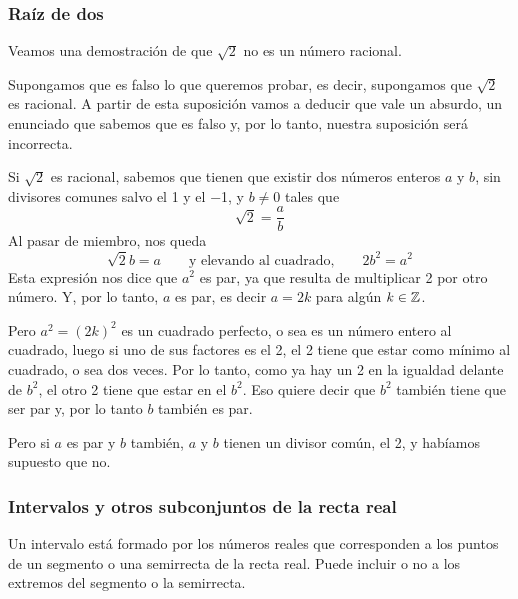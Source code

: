 \documentclass[../teoria.root.tex]{subfiles}
\begin{document}
\subsubsection{Raíz de dos}
Veamos una demostración de que \(\sqrt{2}\) no es un número racional.

Supongamos que es falso lo que queremos probar, es decir, supongamos que \(\sqrt{2}\) es racional.
A partir de esta suposición vamos a deducir que vale un absurdo, un enunciado que sabemos que es falso y, por lo tanto, nuestra suposición será incorrecta.

Si \(\sqrt{2}\) es racional, sabemos que tienen que existir dos números enteros \(a\) y \(b\), sin divisores comunes salvo el 1 y el −1, y \(b \neq 0\) tales que \[\sqrt{2}=\frac{a}{b}\] Al pasar de miembro, nos queda
\[\sqrt{2}b=a\qquad\text{y elevando al cuadrado,}\qquad 2b^2=a^2\]
Esta expresión nos dice que \(a^2\) es par, ya que resulta de multiplicar 2 por otro número.
Y, por lo tanto, \(a\) es par, es decir \(a = 2k\) para algún \(k \in \mathbb{Z}\).

Pero \(a^2 = (2k)^2\) es un cuadrado perfecto, o sea es un número entero al cuadrado, luego si uno de sus factores es el 2, el 2 tiene que estar como mínimo al cuadrado, o sea dos veces.
Por lo tanto, como ya hay un 2 en la igualdad delante de \(b^2\), el otro 2 tiene que estar en el \(b^2\).
Eso quiere decir que \(b^2\) también tiene que ser par y, por lo tanto \(b\) también es par.

Pero si \(a\) es par y \(b\) también, \(a\) y \(b\) tienen un divisor común, el 2, y habíamos supuesto que no.
\subsubsection{Intervalos y otros subconjuntos de la recta real}
Un intervalo está formado por los números reales que corresponden a los puntos de un segmento o una semirrecta de la recta real.
Puede incluir o no a los extremos del segmento o la semirrecta.
\end{document}
